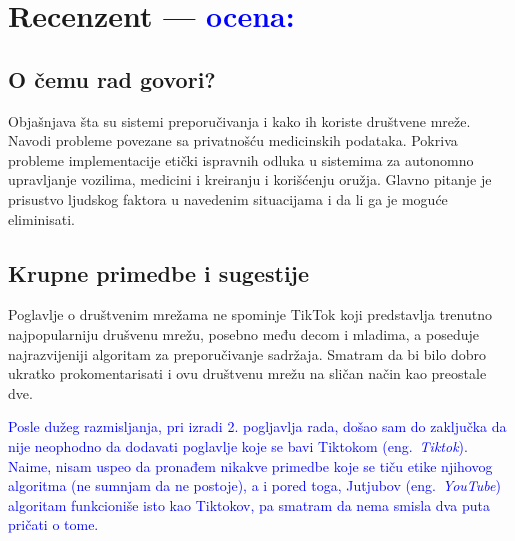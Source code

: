 \documentclass[a4paper]{report}
\newcommand{\odgovor}[1]{\textcolor{blue}{#1}}
\begin{document}
\chapter{Recenzent \odgovor{--- ocena:} }


\section{O čemu rad govori?}
Objašnjava šta su sistemi preporučivanja i kako ih koriste društvene mreže. Navodi probleme povezane sa privatnošću medicinskih  podataka. Pokriva probleme implementacije etički ispravnih odluka u sistemima za autonomno upravljanje vozilima, medicini i kreiranju i korišćenju oružja. Glavno pitanje je prisustvo ljudskog faktora u navedenim situacijama i da li ga je moguće eliminisati.

\section{Krupne primedbe i sugestije}
Poglavlje o društvenim mrežama ne spominje TikTok koji predstavlja trenutno najpopularniju drušvenu mrežu, posebno među decom i mladima, a poseduje najrazvijeniji algoritam za preporučivanje sadržaja. Smatram da bi bilo dobro ukratko prokomentarisati i ovu društvenu mrežu na sličan način kao preostale dve. 

\odgovor{Posle dužeg razmisljanja, pri izradi 2. pogljavlja rada, došao sam do zaključka da nije neophodno da dodavati poglavlje koje se bavi Tiktokom (eng.~{\em Tiktok}). Naime, nisam uspeo da pronađem nikakve primedbe koje se tiču etike njihovog algoritma (ne sumnjam da ne postoje), a i pored toga, Jutjubov (eng.~{\em YouTube})
 algoritam funkcioniše isto kao Tiktokov, pa smatram da nema smisla dva puta pričati o tome.}
\end{document}
